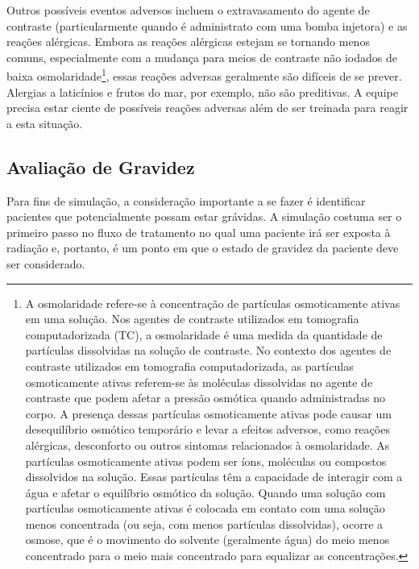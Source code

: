 \documentclass[11pt,a4paper]{article}
\newcounter{exemplo}
\begin{document}
	Outros possíveis eventos adversos incluem o extravasamento do agente de contraste (particularmente quando é administrato com uma bomba injetora) e as reações alérgicas. Embora as reações alérgicas estejam se tornando menos comuns, especialmente com a mudança para meios de contraste não iodados de baixa osmolaridade\footnote{A osmolaridade refere-se à concentração de partículas osmoticamente ativas em uma solução. Nos agentes de contraste utilizados em tomografia computadorizada (TC), a osmolaridade é uma medida da quantidade de partículas dissolvidas na solução de contraste. No contexto dos agentes de contraste utilizados em tomografia computadorizada, as partículas osmoticamente ativas referem-se às moléculas dissolvidas no agente de contraste que podem afetar a pressão osmótica quando administradas no corpo. A presença dessas partículas osmoticamente ativas pode causar um desequilíbrio osmótico temporário e levar a efeitos adversos, como reações alérgicas, desconforto ou outros sintomas relacionados à osmolaridade. As partículas osmoticamente ativas podem ser íons, moléculas ou compostos dissolvidos na solução. Essas partículas têm a capacidade de interagir com a água e afetar o equilíbrio osmótico da solução. Quando uma solução com partículas osmoticamente ativas é colocada em contato com uma solução menos concentrada (ou seja, com menos partículas dissolvidas), ocorre a osmose, que é o movimento do solvente (geralmente água) do meio menos concentrado para o meio mais concentrado para equalizar as concentrações.}, essas reações adversas geralmente são difíceis de se prever. Alergias a laticínios e frutos do mar, por exemplo, não são preditivas. A equipe precisa estar ciente de possíveis reações adversas além de ser treinada para reagir a esta situação.

\subsection*{Avaliação de Gravidez}

	Para fins de simulação, a consideração importante a se fazer é identificar pacientes que  potencialmente possam estar grávidas. A simulação costuma ser o primeiro passo no fluxo de tratamento no qual uma paciente irá ser exposta à radiação e, portanto, é um ponto em que o estado de gravidez da paciente deve ser considerado.
	
\end{document}
